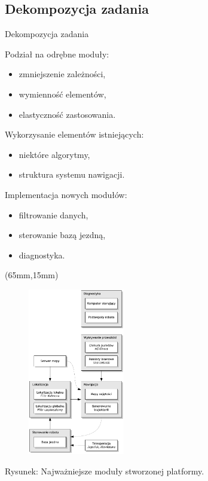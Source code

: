 \documentclass[xcolor=x11names,compress]{beamer}
\renewcommand{\(}{\begin{columns}}
\renewcommand{\)}{\end{columns}}
\newcommand{\<}[1]{\begin{column}{#1}}
\renewcommand{\>}{\end{column}}
\begin{document}
\subsection{Dekompozycja zadania}
\begin{frame}{Dekompozycja zadania}

\alert{Podział na odrębne moduły:}
\begin{itemize}
\item zmniejszenie zależności,
\item wymienność elementów,
\item elastyczność zastosowania.
\end{itemize}

\vspace{.2cm}

\alert{Wykorzysanie elementów istniejących:}
\begin{itemize}
\item niektóre algorytmy,
\item struktura systemu nawigacji.
\end{itemize}

\vspace{.2cm}

\alert{Implementacja nowych modułów:}
\begin{itemize}
\item filtrowanie danych,
\item sterowanie bazą jezdną,
\item diagnostyka.
\end{itemize}

\begin{textblock*}{70mm}(65mm,15mm)%
    \begin{minipage}[l]{70mm}%

	\begin{figure}[h!]
    \centering
    \includegraphics[width=4.2cm]{../MSc/img/decomposition_vert}
    \end{figure}
    \end{minipage}
\end{textblock*}

\vspace{.2cm}
\scriptsize \alert{Rysunek:} Najważniejsze moduły stworzonej platformy.

\end{frame}
\end{document}
